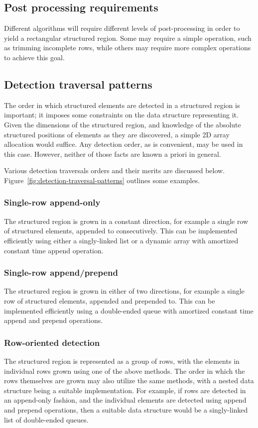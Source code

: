 \subsection{Post processing requirements}
Different algorithms will require different levels of post-processing in order to yield a rectangular structured region. Some may require a simple operation, such as trimming incomplete rows, while others may require more complex operations to achieve this goal.


\subsection{Detection traversal patterns}
The order in which structured elements are detected in a structured region is important; it imposes some constraints on the data structure representing it. Given the dimensions of the structured region, and knowledge of the absolute structured positions of elements as they are discovered, a simple 2D array allocation would suffice. Any detection order, as is convenient, may be used in this case. However, neither of those facts are known a priori in general.

Various detection traversals orders and their merits are discussed below. Figure~\ref{fig:detection-traversal-patterns} outlines some examples.

\subsubsection{Single-row append-only}
\label{append-detection}
The structured region is grown in a constant direction, for example a single row of structured elements, appended to consecutively. This can be implemented efficiently using either a singly-linked list or a dynamic array with amortized constant time append operation.

\subsubsection{Single-row append/prepend}
\label{append-prepend-detection}
The structured region is grown in either of two directions, for example a single row of structured elements, appended and prepended to. This can be implemented efficiently using a double-ended queue with amortized constant time append and prepend operations.

\subsubsection{Row-oriented detection}
The structured region is represented as a group of rows, with the elements in individual rows grown using one of the above methods. The order in which the rows themselves are grown may also utilize the same methods, with a nested data structure being a suitable implementation. For example, if rows are detected in an append-only fashion, and the individual elements are detected using append and prepend operations, then a suitable data structure would be a singly-linked list of double-ended queues.

